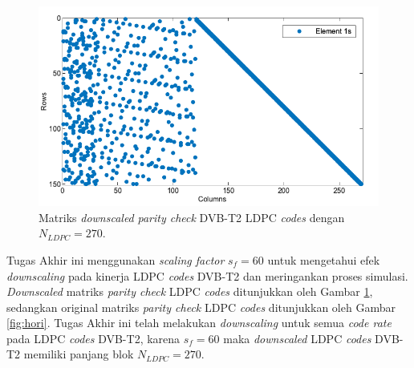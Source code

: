 %		


\begin{figure}[t!]
	\centering
	\includegraphics[width=1\textwidth]
	{pics/hs1-60(1-2)-2}
	\caption{Matriks \textit{downscaled} \textit{parity check} DVB-T2 LDPC \textit{codes} dengan $N_{LDPC}=270$.}
	\label{fig:hds}
\end{figure}
%

Tugas Akhir ini menggunakan \textit{scaling factor} $s_f=60$ untuk mengetahui efek \textit{downscaling} pada kinerja LDPC \textit{codes} DVB-T2  dan meringankan proses simulasi. \textit{Downscaled} matriks \textit{parity check}  LDPC \textit{codes} ditunjukkan oleh Gambar  \ref{fig:hds}, sedangkan original matriks \textit{parity check}  LDPC \textit{codes} ditunjukkan oleh Gambar \ref{fig:hori}. Tugas Akhir ini telah melakukan \textit{downscaling} untuk semua \textit{code rate} pada LDPC \textit{codes} DVB-T2, karena $s_f=60$ maka \textit{downscaled} LDPC \textit{codes} DVB-T2 memiliki panjang blok $N_{LDPC}=270$.

